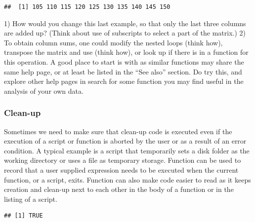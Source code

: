 \documentclass[krantz2]{krantz}\usepackage{knitr}
\begin{document}
\begin{explainbox}
\begin{knitrout}\footnotesize
{}\color{fgcolor}\begin{kframe}
\begin{alltt}
\end{alltt}
\begin{verbatim}
##  [1] 105 110 115 120 125 130 135 140 145 150
\end{verbatim}
\end{kframe}
\end{knitrout}

\end{explainbox}

\begin{playground}
1) How would you change this last example, so that only the last three columns are added up? (Think about use of subscripts to select a part of the matrix.)
2) To obtain column sums, one could modify the nested loops (think how), transpose the matrix and use  (think how), or look up if there is in \Rlang a function for this operation. A good place to start is with  as similar functions may share the same help page, or at least be listed in the ``See also'' section. Do try this, and explore other help pages in search for some function you may find useful in the analysis of your own data.
\end{playground}

\subsubsection{Clean-up}

Sometimes we need to make sure that clean-up code is executed even if the execution of a script or function is aborted by the user or as a result of an error condition. A typical example is a script that temporarily sets a disk folder as the working directory or uses a file as temporary storage. Function  can be used to record that a user supplied expression needs to be executed when the current function, or a script, exits. Function  can also make code easier to read as it keeps creation and clean-up next to each other in the body of a function or in the listing of a script.

\begin{knitrout}\footnotesize
{}\color{fgcolor}\begin{kframe}
\begin{alltt}
\hlstd{(}\hlstd{)}
\end{alltt}
\begin{verbatim}
## [1] TRUE
\end{verbatim}
\begin{alltt}
\hlstd{(}\hlstd{(}\hlstd{))}
\end{alltt}
\end{kframe}
\end{knitrout}
\end{document}
